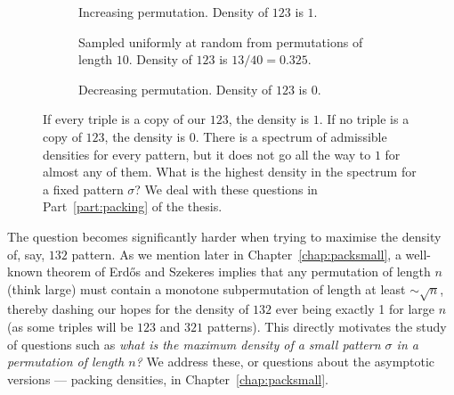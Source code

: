 \documentclass[12pt, a4paper, twoside]{report}
\begin{document}
\begin{figure}[!ht]
\centering
\begin{subfigure}[t]{0.3\textwidth}
  \centering
  \caption{Increasing permutation. Density of $123$ is $1$.}
\end{subfigure}\hfill
\begin{subfigure}[t]{0.3\textwidth}
  \centering
  \caption{Sampled uniformly at random from permutations of length $10$. Density of $123$ is $13/40= 0.325$.}
\end{subfigure}\hfill
\begin{subfigure}[t]{0.3\textwidth}
  \centering
  \caption{Decreasing permutation. Density of $123$ is $0$.}
\end{subfigure}
\caption{If every triple is a copy of our $123$, the density is $1$. If no triple is a copy of $123$, the density is $0$. There is a spectrum of admissible densities for every pattern, but it does not go all the way to $1$ for almost any of them. What is the highest density in the spectrum for a fixed pattern $\sigma$? We deal with these questions in Part~\ref{part:packing} of the thesis.}
\label{fig:densities_spectrum}
\end{figure}

The question becomes significantly harder when trying to maximise the density of, say, $132$ pattern. As we mention later in Chapter~\ref{chap:packsmall}, a well-known theorem of Erd\H{o}s and Szekeres implies that any permutation of length $n$ (think large) must contain a monotone subpermutation of length at least $\sim \sqrt{n}$, thereby dashing our hopes for the density of $132$ ever being exactly 1 for large $n$ (as some triples will be $123$ and $321$ patterns). This directly motivates the study of questions such as \emph{what is the maximum density of a small pattern $\sigma$ in a permutation of length $n$?} We address these, or questions about the asymptotic versions --- packing densities, in Chapter~\ref{chap:packsmall}.
\end{document}

